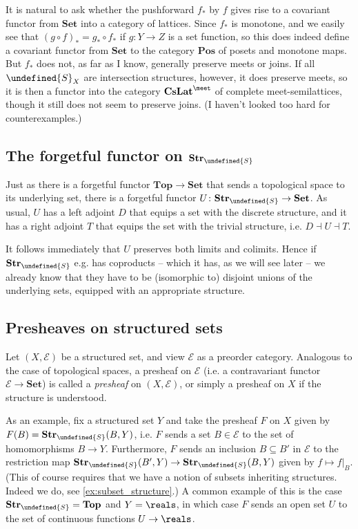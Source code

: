 \documentclass[article, a4paper, 11pt, oneside]{memoir}
\let\mathfrak\undefined
\numberwithin{equation}{chapter}
\newcommand{\calE}{\mathcal{E}}
\newcommand{\strucS}{\mathfrak{S}}
\newcommand{\ncat}[1]{\mathbf{#1}} %
\newcommand{\catSet}{\ncat{Set}} %
\newcommand{\catTop}{\ncat{Top}} %
\newcommand{\catPos}{\ncat{Pos}} %
\newcommand{\catCMeetLat}{\ncat{CsLat}^{\meet}} %
\newcommand{\catStruc}[1]{\ncat{Str}_{#1}} %
\newcommand{\catStrucS}{\catStruc{\strucS}} %
\begin{document}
It is natural to ask whether the pushforward $f_*$ by $f$ gives rise to a covariant functor from $\catSet$ into a category of lattices. Since $f_*$ is monotone, and we easily see that $(g \circ f)_* = g_* \circ f_*$ if $g \colon Y \to Z$ is a set function, so this does indeed define a covariant functor from $\catSet$ to the category $\catPos$ of posets and monotone maps. But $f_*$ does not, as far as I know, generally preserve meets or joins. If all $\strucS_X$ are intersection structures, however, it does preserve meets, so it is then a functor into the category $\catCMeetLat$ of complete meet-semilattices, though it still does not seem to preserve joins. (I haven't looked too hard for counterexamples.)


\subsection{The forgetful functor on $\catStrucS$}

Just as there is a forgetful functor $\catTop \to \catSet$ that sends a topological space to its underlying set, there is a forgetful functor $U \colon \catStrucS \to \catSet$. As usual, $U$ has a left adjoint $D$ that equips a set with the discrete structure, and it has a right adjoint $T$ that equips the set with the trivial structure, i.e. $D \dashv U \dashv T$.

It follows immediately that $U$ preserves both limits and colimits. Hence if $\catStrucS$ e.g. has coproducts -- which it has, as we will see later -- we already know that they have to be (isomorphic to) disjoint unions of the underlying sets, equipped with an appropriate structure.


\subsection{Presheaves on structured sets}

Let $(X, \calE)$ be a structured set, and view $\calE$ as a preorder category. Analogous to the case of topological spaces, a presheaf on $\calE$ (i.e. a contravariant functor $\calE \to \catSet$) is called a \emph{presheaf} on $(X, \calE)$, or simply a presheaf on $X$ if the structure is understood.

As an example, fix a structured set $Y$ and take the presheaf $F$ on $X$ given by $F(B) = \catStrucS(B,Y)$, i.e. $F$ sends a set $B \in \calE$ to the set of homomorphisms $B \to Y$. Furthermore, $F$ sends an inclusion $B \subseteq B'$ in $\calE$ to the restriction map $\catStrucS(B',Y) \to \catStrucS(B,Y)$ given by $f \mapsto f|_B$. (This of course requires that we have a notion of subsets inheriting structures. Indeed we do, see \cref{ex:subset_structure}.) A common example of this is the case $\catStrucS = \catTop$ and $Y = \reals$, in which case $F$ sends an open set $U$ to the set of continuous functions $U \to \reals$.
\end{document}
